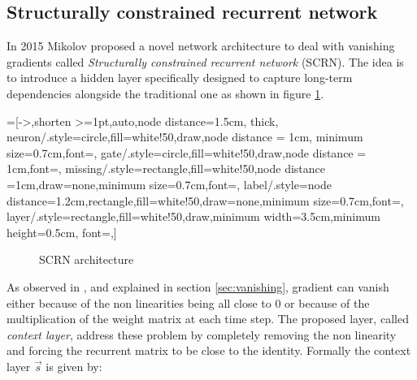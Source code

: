 \subsection{Structurally constrained recurrent network}

In 2015 Mikolov proposed a novel network architecture to deal with vanishing gradients \cite{scrn} called 
\textit{Structurally constrained recurrent network} (SCRN). The idea is to introduce a hidden layer specifically 
designed to capture long-term dependencies alongside the traditional one as shown in figure \ref{fig:scrn}.


=[->,shorten >=1pt,auto,node distance=1.5cm,
  thick,
  neuron/.style={circle,fill=white!50,draw,node distance = 1cm, minimum size=0.7cm,font=\sffamily\Large\bfseries},
  gate/.style={circle,fill=white!50,draw,node distance = 1cm,font=\sffamily\small\bfseries},
  missing/.style={rectangle,fill=white!50,node distance =1cm,draw=none,minimum size=0.7cm,font=\sffamily\Huge\bfseries},
  label/.style={node distance=1.2cm,rectangle,fill=white!50,draw=none,minimum size=0.7cm,font=\sffamily\normalsize},
  layer/.style={rectangle,fill=white!50,draw,minimum width=3.5cm,minimum height=0.5cm, font=\sffamily\normalsize},]
\begin{figure}[!h]
 \centering
{}
\caption{SCRN architecture}
\label{fig:scrn}
\end{figure}


As observed in \cite{scrn}, and explained in section \ref{sec:vanishing}, gradient can vanish either because of the 
non linearities being all close to 0 or because of the multiplication of the weight matrix at each time step. The proposed 
layer, called \textit{context layer}, address these problem by completely removing the non linearity and forcing the 
recurrent matrix to be close to the identity. Formally the context layer  $\vec{s}$ is given by:

